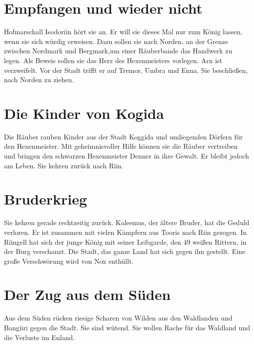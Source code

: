 \documentclass[12pt,a4paper,onecolumn,twoside,ngerman]{book}
\newcommand{\Bangiri}{Bangiiri}
\newcommand{\Enland}{Enland}
\newcommand{\Nox}{Nox}
\newcommand{\Umbra}{Umbra}
\newcommand{\Enna}{Enna}
\newcommand{\Tremor}{Tremor}
\newcommand{\Nordmark}{Nordmark}
\newcommand{\Bergmark}{Bergmark}
\newcommand{\Arn}{Arn}
\newcommand{\Rhingell}{Riingell}
\newcommand{\Rhin}{Riin}
\newcommand{\Kalemus}{Kaleemus}
\newcommand{\Isodoriin}{Isodoriin}
\newcommand{\Kogida}{Koggida}
\newcommand{\Denner}{Denner}
\newcommand{\Toris}{Tooris}
\begin{document}
{%

\section{Empfangen und wieder nicht}
Hofmarschall {\Isodoriin} hört sie an. Er will sie dieses Mal nur zum König lassen, wenn sie sich würdig erweisen. Dazu sollen sie nach Norden, an der Grenze zwischen {\Nordmark} und {\Bergmark},um einer Räuberbande das Handwerk zu legen. Als Beweis sollen sie das Herz des Hexenmeisters vorlegen.\linebreak
{\Arn} ist verzweifelt. Vor der Stadt trifft er auf {\Tremor}, {\Umbra} und {\Enna}. Sie beschließen, nach Norden zu ziehen.

\section{Die Kinder von Kogida}
Die Räuber rauben Kinder aus der Stadt {\Kogida} und umliegenden Dörfern für den Hexenmeister. Mit geheimnisvoller Hilfe können sie die Räuber vertreiben und bringen den schwarzen Hexenmeister {\Denner} in ihre Gewalt. Er bleibt jedoch am Leben. Sie kehren zurück nach {\Rhin}.

\section{Bruderkrieg}
Sie kehren gerade rechtzeitig zurück. {\Kalemus}, der ältere Bruder, hat die Geduld verloren. Er ist zusammen mit vielen Kämpfern aus {\Toris} nach {\Rhin} gezogen. In {\Rhingell} hat sich der junge König mit seiner Leibgarde, den 49 weißen Rittern, in der Burg verschanzt. Die Stadt, das ganze Land hat sich gegen ihn gestellt.\linebreak
Eine große Verschwörung wird von {\Nox} enthüllt.

\section{Der Zug aus dem Süden}
Aus dem Süden rücken riesige Scharen von Wilden aus den Waldlanden und {\Bangiri} gegen die Stadt. Sie sind wütend. Sie wollen Rache für das Waldland und die Verluste im {\Enland}.

}
\end{document}

